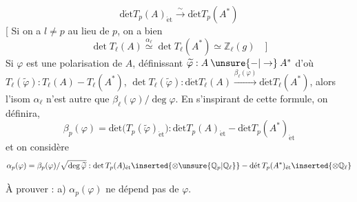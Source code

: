 \[
\operatorname{d\acute et}T_p(A)_{\mathrm{\acute et}}\xrightarrow{\sim}\operatorname{d\acute et}T_p(A^*)
\]
[ Si on a $l\ne p$ au lieu de $p$, on a bien
\[
\det T_{\ell}(A)\overset{\alpha_\ell}{\simeq}\det T_\ell(A^*)\simeq\mathbb Z_\ell(g)\quad]
\]
 Si $\varphi$ est une
polarisation de $A$,
définissant $\widetilde\varphi:A\mathbin{\unsure{-|\to}}A^*$ d'où $T_\ell(\widetilde\varphi):T_\ell(A)\mathbin{-}T_\ell(A^*)$,
$\operatorname{det}T_\ell(\widetilde\varphi):\operatorname{d\acute et}T_\ell(A)\xrightarrow{\beta_\ell(\varphi)}\operatorname{d\acute et}T_\ell(A^*)$,
alors l'isom $\alpha_\ell$ n'est autre que $\beta_\ell(\varphi)/\deg\varphi$. En s'inspirant de
cette formule, on définira,
\[
\beta_p(\varphi)=\operatorname{d\acute et}\bigl(T_p(\widetilde\varphi)_{\mathrm{\acute et}}\bigr):
\operatorname{d\acute et}T_p(A)_{\mathrm{\acute et}}\mathbin{-}\operatorname{d\acute et}T_p(A^*)_{\mathrm{\acute et}}
\]
et on considère
\[
\alpha_p(\varphi)=\beta_p(\varphi)/\sqrt{\deg\widetilde\varphi}:
\det T_p(A)_{\mathrm{\acute et}}\inserted{\otimes\unsure{\mathbb Q_p|\mathbb Q_\ell}}\mathbin{-}
\operatorname{d\acute et}T_p(A^*)_{\mathrm{\acute et}}\inserted{\otimes\mathbb Q_\ell}
\]

À prouver : a) $\alpha_p(\varphi)$ ne dépend pas de $\varphi$.


\deleted{\[
\left\{\begin{aligned}
&\deg u\text{ est un carré parfait}\\
&\operatorname{d\acute et}\bigl(T_p(u)_{\mathrm{\acute et}}\bigr)=\sqrt{\deg u}\qquad\text{i.e.}\\
&\deg u=\bigl(\operatorname{d\acute et}(T_p(u)_{\mathrm{\acute et}})\bigr)^{2}\quad\text{\uline{et}, }\det T_p(u)_{\mathrm{\acute et}}\text{ est un entier }\unsure{>0|\geq0}
\end{aligned}\right.
\]}
